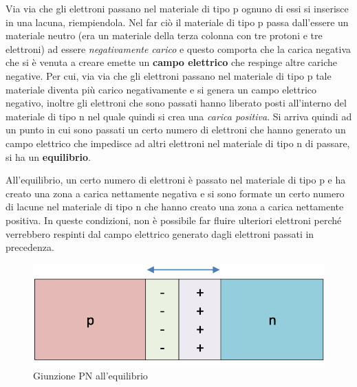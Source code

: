 \documentclass[12pt, a4paper]{report}
\begin{document}
Via via che gli elettroni passano nel materiale di tipo p ognuno di essi si inserisce in una lacuna, riempiendola. Nel far ciò il materiale di tipo p passa dall'essere un materiale neutro (era un materiale della terza colonna con tre protoni e tre elettroni) ad essere \textit{negativamente carico} e questo comporta che la carica negativa che si è venuta a creare emette un \textbf{campo elettrico} che respinge altre cariche negative. Per cui, via via che gli elettroni passano nel materiale di tipo p tale materiale diventa più carico negativamente e si genera un campo elettrico negativo, inoltre gli elettroni che sono passati hanno liberato posti all'interno del materiale di tipo n nel quale quindi si crea una \textit{carica positiva}. Si arriva quindi ad un punto in cui sono passati un certo numero di elettroni che hanno generato un campo elettrico che impedisce ad altri elettroni nel materiale di tipo n di passare, si ha un \textbf{equilibrio}.

All'equilibrio, un certo numero di elettroni è passato nel materiale di tipo p e ha creato una zona a carica nettamente negativa e si sono formate un certo numero di lacune nel materiale di tipo n che hanno creato una zona a carica nettamente positiva. In queste condizioni, non è possibile far fluire ulteriori elettroni perché verrebbero respinti dal campo elettrico generato dagli elettroni passati in precedenza.
\begin{figure}[ht]
\centering
\includegraphics[scale=0.4,angle=0]{giunzione_pn_equilibrio.png}
\caption{Giunzione PN all'equilibrio}
\end{figure}
\end{document}
